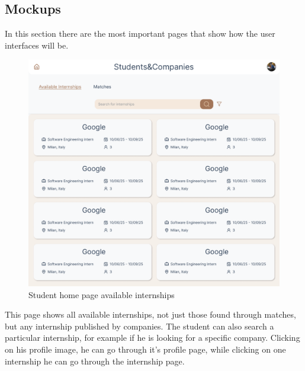 \documentclass{article}
\begin{document}
\subsection{Mockups}
In this section there are the most important pages that show how the user interfaces will be.
\begin{figure}[H]
    \centering
    \includegraphics[width=1\linewidth]{interface/HomePage-studente- def.png}
    \caption{Student home page available internships}
    \label{fig:enter-label}
\end{figure}
This page shows all available internships, not just those found through matches, but any internship published by companies. The student can also search a particular internship, for example if he is looking for a specific company. Clicking on his profile image, he can go through it's profile page, while clicking on one internship he can go through the internship page.
\end{document}
